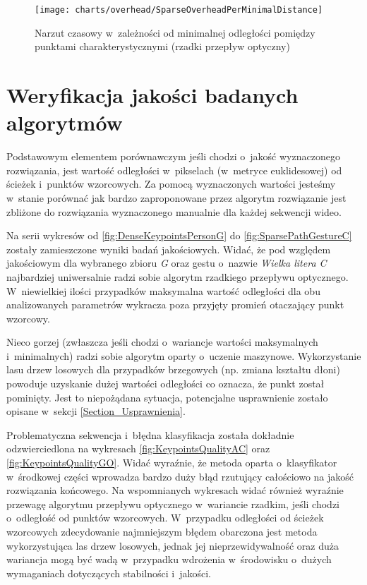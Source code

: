       \begin{figure}[!ht]
        \centering
        \texttt{[image: charts/overhead/SparseOverheadPerMinimalDistance]}
        \caption[Narzut czasowy w~zależności od minimalnej odległości pomiędzy punktami charakterystycznymi]
                {Narzut czasowy w~zależności od minimalnej odległości pomiędzy punktami charakterystycznymi (rzadki przepływ optyczny)}
        \label{fig:SpecialisedSparseOverhead}
      \end{figure}

  \section{Weryfikacja jakości badanych algorytmów}\label{Section_Quality}

    Podstawowym elementem porównawczym jeśli chodzi o~jakość wyznaczonego rozwiązania, jest wartość odległości w~pikselach (w~metryce euklidesowej) od ścieżek i~punktów wzorcowych. Za pomocą wyznaczonych wartości jesteśmy w~stanie porównać jak bardzo zaproponowane przez algorytm rozwiązanie jest zbliżone do rozwiązania wyznaczonego manualnie dla każdej sekwencji wideo.

    Na serii wykresów od \ref{fig:DenseKeypointsPersonG} do \ref{fig:SparsePathGestureC} zostały zamieszczone wyniki badań jakościowych. Widać, że pod względem jakościowym dla wybranego zbioru \textit{G} oraz gestu o~nazwie \textit{Wielka litera C} najbardziej uniwersalnie radzi sobie algorytm rzadkiego przepływu optycznego. W~niewielkiej ilości przypadków maksymalna wartość odległości dla obu analizowanych parametrów wykracza poza przyjęty promień otaczający punkt wzorcowy.

    Nieco gorzej (zwłaszcza jeśli chodzi o~wariancje wartości maksymalnych i~minimalnych) radzi sobie algorytm oparty o~uczenie maszynowe. Wykorzystanie lasu drzew losowych dla przypadków brzegowych (np. zmiana kształtu dłoni) powoduje uzyskanie dużej wartości odległości co oznacza, że punkt został pominięty. Jest to niepożądana sytuacja, potencjalne usprawnienie zostało opisane w~sekcji \ref{Section_Usprawnienia}.

    Problematyczna sekwencja i~błędna klasyfikacja została dokładnie odzwierciedlona na wykresach \ref{fig:KeypointsQualityAC} oraz \ref{fig:KeypointsQualityGO}. Widać wyraźnie, że metoda oparta o~klasyfikator w~środkowej części wprowadza bardzo duży błąd rzutujący całościowo na jakość rozwiązania końcowego. Na wspomnianych wykresach widać również wyraźnie przewagę algorytmu przepływu optycznego w~wariancie rzadkim, jeśli chodzi o~odległość od punktów wzorcowych. W~przypadku odległości od ścieżek wzorcowych zdecydowanie najmniejszym błędem obarczona jest metoda wykorzystująca las drzew losowych, jednak jej nieprzewidywalność oraz duża wariancja mogą być wadą w~przypadku wdrożenia w~środowisku o~dużych wymaganiach dotyczących stabilności i~jakości.

